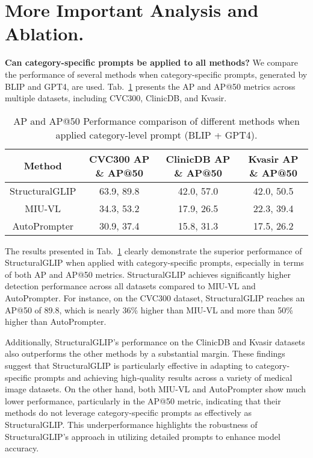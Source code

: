 \clearpage
\appendix

\renewcommand\thefigure{\Alph{figure}}
\renewcommand\thetable{\Alph{table}}
\setcounter{figure}{0}
\setcounter{table}{0}

\section{More Important Analysis and Ablation.}\label{app:more-analysis}


\textbf{Can category-specific prompts be applied to all methods?} We compare the performance of several methods when category-specific prompts, generated by BLIP and GPT4, are used. Tab.~\ref{tab:category-prompt-diff-methods} presents the AP and AP@50 metrics across multiple datasets, including CVC300, ClinicDB, and Kvasir.

\begin{table}[ht]
\centering
\caption{AP and AP@50 Performance comparison of different methods when applied category-level prompt (BLIP + GPT4).}
\label{tab:category-prompt-diff-methods}
\begin{tabular}{cccc}
\toprule
{Method} & {CVC300 AP \& AP@50} & {ClinicDB AP \& AP@50} & {Kvasir AP \& AP@50} \\ \toprule
{StructuralGLIP} & 63.9, 89.8 & 42.0, 57.0 & 42.0, 50.5 \\
{MIU-VL} & 34.3, 53.2 & 17.9, 26.5 & 22.3, 39.4 \\
{AutoPrompter } & 30.9, 37.4 & 15.8, 31.3 & 17.5, 26.2 \\
\bottomrule
\end{tabular}
\end{table}

The results presented in Tab.~\ref{tab:category-prompt-diff-methods} clearly demonstrate the superior performance of StructuralGLIP when applied with category-specific prompts, especially in terms of both AP and AP@50 metrics. StructuralGLIP achieves significantly higher detection performance across all datasets compared to MIU-VL and AutoPrompter. For instance, on the CVC300 dataset, StructuralGLIP reaches an AP@50 of 89.8, which is nearly 36\% higher than MIU-VL and more than 50\% higher than AutoPrompter.

Additionally, StructuralGLIP's performance on the ClinicDB and Kvasir datasets also outperforms the other methods by a substantial margin. These findings suggest that StructuralGLIP is particularly effective in adapting to category-specific prompts and achieving high-quality results across a variety of medical image datasets. On the other hand, both MIU-VL and AutoPrompter show much lower performance, particularly in the AP@50 metric, indicating that their methods do not leverage category-specific prompts as effectively as StructuralGLIP. This underperformance highlights the robustness of StructuralGLIP's approach in utilizing detailed prompts to enhance model accuracy.

